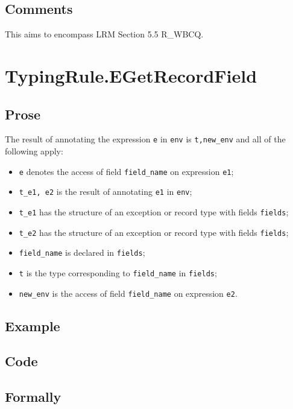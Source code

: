 \documentclass{book}
\begin{document}
\subsection{Comments}
  This aims to encompass LRM Section 5.5 R\_WBCQ.

 
\section{TypingRule.EGetRecordField \label{sec:TypingRule.EGetRecordField}}

  \subsection{Prose}
  The result of annotating the expression \texttt{e} in \texttt{env} is
\texttt{t,new\_env} and all of the following apply:
  \begin{itemize}
  \item \texttt{e} denotes the access of field \texttt{field\_name} on expression \texttt{e1};
  \item \texttt{t\_e1, e2} is the result of annotating \texttt{e1} in \texttt{env};
  \item \texttt{t\_e1} has the structure of an exception or record type with fields \texttt{fields};
  \item \texttt{t\_e2} has the structure of an exception or record type with fields \texttt{fields};
  \item \texttt{field\_name} is declared in \texttt{fields};
  \item \texttt{t} is the type corresponding to \texttt{field\_name} in \texttt{fields};
  \item \texttt{new\_env} is the access of field \texttt{field\_name} on expression \texttt{e2}.
  \end{itemize}

  \subsection{Example}

  \subsection{Code}

\begin{emptyformal}
    \subsection{Formally}
\end{emptyformal}
\end{document}
